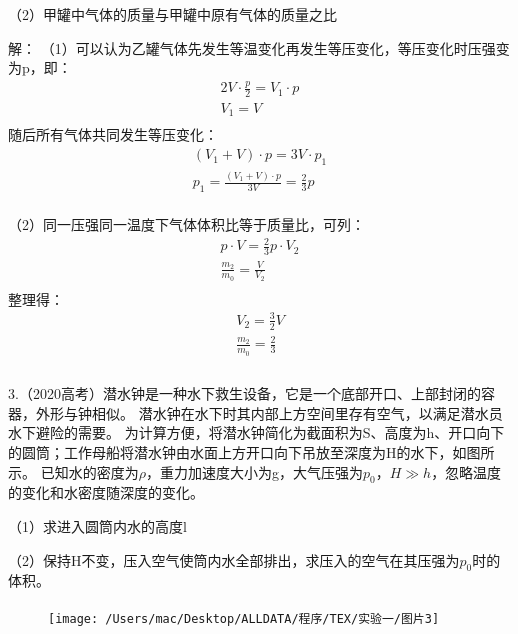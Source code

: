 \documentclass[UTF8]{ctexart}
\begin{document}
    （2）甲罐中气体的质量与甲罐中原有气体的质量之比

解：
（1）可以认为乙罐气体先发生等温变化再发生等压变化，等压变化时压强变为p，即：
\begin{gather*}
    2V \cdot \frac{p}{2} = V_{1} \cdot p\\
    V_{1} = V\\
\end{gather*}
随后所有气体共同发生等压变化：
\begin{gather*}
    (V_{1} + V) \cdot p = 3V \cdot p_{1}\\
    p_{1} = \frac{(V_{1} + V) \cdot p}{3V} = \frac{2}{3}  p\\
\end{gather*}

（2）同一压强同一温度下气体体积比等于质量比，可列：
\begin{gather*}
    p \cdot V = \frac{2}{3}p \cdot V_{2}\\
    \frac{m_{2}}{m_{0}} = \frac{V}{V_{2}}\\
\end{gather*}
整理得：
\begin{gather*}
    V_{2} = \frac{3}{2}V\\
    \frac{m_{2}}{m_{0}} = \frac{2}{3}\\
\end{gather*}

\paragraph{}


    3.（2020高考）潜水钟是一种水下救生设备，它是一个底部开口、上部封闭的容器，外形与钟相似。
    潜水钟在水下时其内部上方空间里存有空气，以满足潜水员水下避险的需要。
    为计算方便，将潜水钟简化为截面积为S、高度为h、开口向下的圆筒；工作母船将潜水钟由水面上方开口向下吊放至深度为H的水下，如图所示。
    已知水的密度为$\rho$，重力加速度大小为g，大气压强为$p_{0}$，$H \gg h$，忽略温度的变化和水密度随深度的变化。

    （1）求进入圆筒内水的高度l

    （2）保持H不变，压入空气使筒内水全部排出，求压入的空气在其压强为$p_{0}$时的体积。

\begin{figure}[htbp]
\paragraph{} \texttt{[image: /Users/mac/Desktop/ALLDATA/程序/TEX/实验一/图片3]}\label{fig:figure1}
\end{figure}
\end{document}

